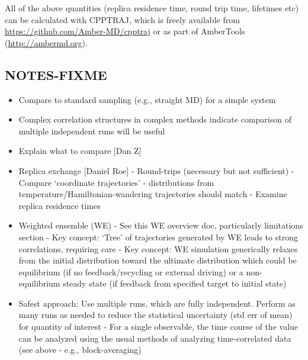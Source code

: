 All of the above quantities (replica residence time, round trip time, lifetimes etc) can be calculated with CPPTRAJ,\citep{Roe2013} which is freely available from \url{https://github.com/Amber-MD/cpptraj} or as part of AmberTools (\url{http://ambermd.org}).

\subsection{NOTES-FIXME}
\begin{itemize}
  \item Compare to standard sampling (e.g., straight MD) for a simple system
  \item Complex correlation structures in complex methods indicate comparison of multiple independent runs will be useful
  \item Explain what to compare [Dan Z]
  \item Replica exchange [Daniel Roe]
    - Round-trips (necessary but not sufficient)
    - Compare ‘coordinate trajectories’ - distributions from temperature/Hamiltonian-wandering trajectories should match
    - Examine replica residence times
  \item Weighted ensemble (WE)
    - See this WE overview doc, particularly limitations section
    - Key concept: ‘Tree’ of trajectories generated by WE leads to strong correlations, requiring care
    - Key concept: WE simulation generically relaxes from the initial distribution toward the ultimate distribution which could be equilibrium (if no feedback/recycling or external driving) or a non-equilibrium steady state (if feedback from specified target to initial state)
  \item Safest approach: Use multiple runs, which are fully independent.  Perform as many runs as needed to reduce the statistical uncertainty (std err of mean) for quantity of interest
    - For a single observable, the time course of the value can be analyzed using the usual methods of analyzing time-correlated data (see above - e.g., block-averaging)
\end{itemize}

